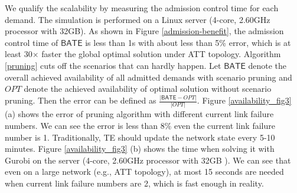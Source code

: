 \documentclass[sigconf]{acmart}
\begin{document}
We qualify the scalability by measuring the admission control time for each demand.
The simulation is performed on a Linux server (4-core, 2.60GHz processor with 32GB).
As shown in Figure \ref{admission-benefit}, the admission control time of $\mathsf{BATE}$ is less than 1s with about less than 5\% error, which is at least 30$\times$ faster the global optimal solution under ATT topology.
Algorithm \ref{pruning} cuts off the scenarios that can hardly happen.
Let $\mathsf{BATE}$ denote the overall achieved availability of all admitted demands with scenario pruning  and $OPT$ denote the achieved availability of optimal solution without scenario pruning. 
Then the error can be defined as $\frac{|\mathsf{BATE} -OPT|}{|OPT|}$.
Figure \ref{availability_fig3} (a) shows the error of pruning algorithm with different current link failure numbers.
We can see the error is less than 8\% even the current link failure number is 1.
Traditionally, TE should update the network state every 5-10 minutes.
Figure \ref{availability_fig3} (b) shows the time when solving it with Gurobi \cite{gurobi} on the server (4-core, 2.60GHz processor with 32GB ).
We can see that even on a large network (e.g., ATT topology), at most  15 seconds are needed when current link failure numbers are 2, which is fast enough in reality.
\end{document}
